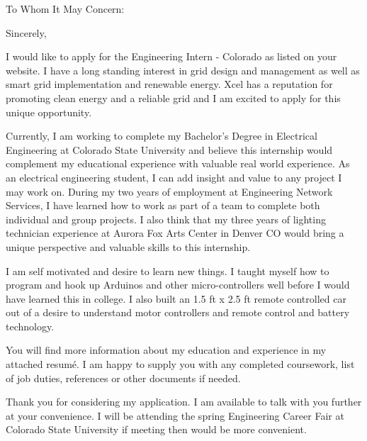 \documentclass[10pt,letterpaper,sans]{moderncv}        %
\begin{document}



\clearpage
{}
\date{\today}
\opening{To Whom It May Concern:}
\closing{Sincerely,}
\makelettertitle

I would like to apply for the Engineering Intern - Colorado as listed on your website. I have a long standing interest in grid design and management as well as smart grid implementation and renewable energy. Xcel has a reputation for promoting clean energy and a reliable grid and I am excited to apply for this unique opportunity.

Currently, I am working to complete my Bachelor's Degree in Electrical Engineering at Colorado State University and believe this internship would complement my educational experience with valuable real world experience. As an electrical engineering student, I can add insight and value to any project I may work on. During my two years of employment at Engineering Network Services, I have learned how to work as part of a team to complete both individual and group projects. I also think that my three years of lighting technician experience at Aurora Fox Arts Center in Denver CO would bring a unique perspective and valuable skills to this internship.  

I am self motivated and desire to learn new things. I taught myself how to program and hook up Arduinos and other micro-controllers well before I would have learned this in college. I also built an 1.5 ft x 2.5 ft remote controlled car out of a desire to understand motor controllers and remote control and battery technology.

You will find more information about my education and experience in my attached resum\'e. I am happy to supply you with any completed coursework, list of job duties, references or other documents if needed.

Thank you for considering my application. I am available to talk with you further at your convenience. I will be attending the spring Engineering Career Fair at Colorado State University if meeting then would be more convenient.



\makeletterclosing
\end{document}
